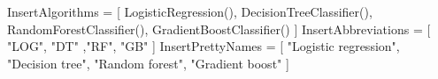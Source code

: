 InsertAlgorithms = [
  LogisticRegression(),
  DecisionTreeClassifier(),
  RandomForestClassifier(),
  GradientBoostClassifier()
]
InsertAbbreviations = [
  "LOG", "DT" ,"RF", "GB"
]
InsertPrettyNames = [
  "Logistic regression",
  "Decision tree",
  "Random forest",
  "Gradient boost"
]
